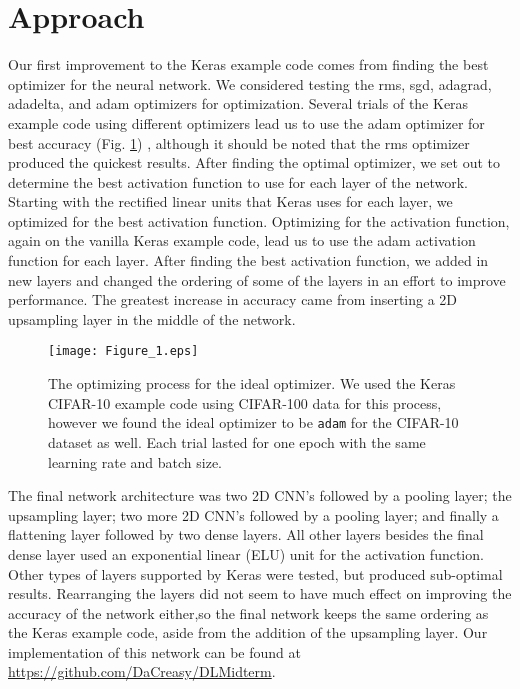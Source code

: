 \documentclass{article}
\begin{document}
\section{Approach}
Our first improvement to the Keras example code comes from finding the best optimizer for the neural network. We considered testing the rms, sgd, adagrad, adadelta, and adam optimizers for optimization. Several trials of the Keras example code using different optimizers lead us to use the adam optimizer for best accuracy (Fig. \ref{Fig: 1}) , although it should be noted that the rms optimizer produced the quickest results. After finding the optimal optimizer, we set out to determine the best activation function to use for each layer of the network. Starting with the rectified linear units that Keras uses for each layer, we optimized for the best activation function. Optimizing for the activation function, again on the vanilla Keras example code, lead us to use the adam activation function for each layer. After finding the best activation function, we added in new layers and changed the ordering of some of the layers in an effort to improve performance. The greatest increase in accuracy came from inserting a 2D upsampling layer in the middle of the network. \newline \indent

\begin{figure}[htpb!]
      \centering
      \texttt{[image: Figure\_1.eps]}
      \caption{The optimizing process for the ideal optimizer. We used the Keras CIFAR-10 example code using CIFAR-100 data for this process, however we found the ideal optimizer to be \texttt{adam} for the CIFAR-10 dataset as well. Each trial lasted for one epoch with the same learning rate and batch size.}\label{Fig: 1}
\end{figure}

The final network architecture was two 2D CNN’s followed by a pooling layer; the upsampling layer; two more 2D CNN’s followed by a pooling layer; and finally a flattening layer followed by two dense layers.
All other layers besides the final dense layer used an exponential linear (ELU) unit for the activation function. Other types of layers supported by Keras were tested, but produced sub-optimal results. Rearranging the layers did not seem to have much effect on improving the accuracy of the network either,so the final network keeps the same ordering as the Keras example code, aside from the addition of the upsampling layer. Our implementation of this network can be found at \url{https://github.com/DaCreasy/DLMidterm}.
\end{document}
